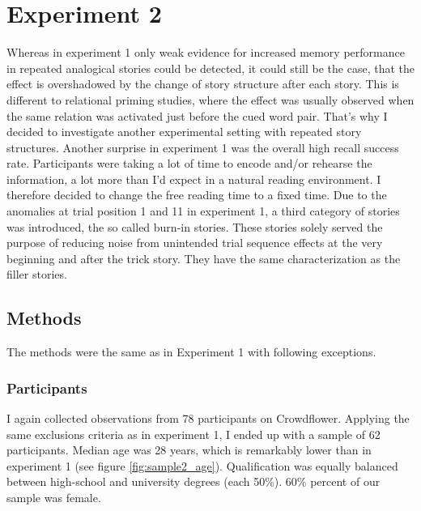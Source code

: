 \documentclass[a4paper,man,natbib,floatsintext,import]{apa6}
\begin{document}
\section{Experiment 2}
Whereas in experiment 1 only weak evidence for increased memory performance in repeated analogical stories could be detected, it could still be the case, that the effect is overshadowed by the change of story structure after each story. This is different to relational priming studies, where the effect was usually observed when the same relation was activated just before the cued word pair. That's why I decided to investigate another experimental setting with repeated story structures.
Another surprise in experiment 1 was the overall high recall success rate. Participants were taking a lot of time to encode and/or rehearse the information, a lot more than I'd expect in a natural reading environment. I therefore decided to change the free reading time to a fixed time.
Due to the anomalies at trial position 1 and 11 in experiment 1, a third category of stories was introduced, the so called burn-in stories. These stories solely served the purpose of reducing noise from unintended trial sequence effects at the very beginning and after the trick story. They have the same characterization as the filler stories.

\subsection{Methods}
The methods were the same as in Experiment 1 with following exceptions.

\subsubsection{Participants}
I again collected observations from 78 participants on Crowdflower. Applying the same exclusions criteria as in experiment 1, I ended up with a sample of 62 participants. Median age was 28 years, which is remarkably lower than in experiment 1 (see figure \ref{fig:sample2_age}). Qualification was equally balanced between high-school and university degrees (each 50\%). 60\% percent of our sample was female.
\end{document}
